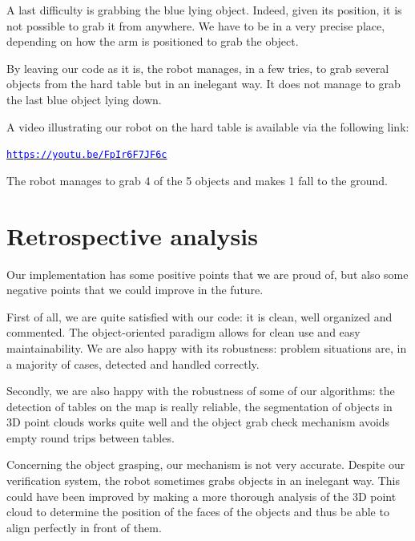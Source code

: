 \documentclass[a4paper, 10pt, conference]{ieeeconf}
\begin{document}
    A last difficulty is grabbing the blue lying object. Indeed, given its position, it is not possible to grab it from anywhere. We have to be in a very precise place, depending on how the arm is positioned to grab the object.
    
    By leaving our code as it is, the robot manages, in a few tries, to grab several objects from the hard table but in an inelegant way. It does not manage to grab the last blue object lying down.
    
    A video illustrating our robot on the hard table is available via the following link:
    
    \begin{center}
        \href{https://youtu.be/FpIr6F7JF6c}{\texttt{\textcolor{blue}{https://youtu.be/FpIr6F7JF6c}}}
    \end{center}
    
    The robot manages to grab 4 of the 5 objects and makes 1 fall to the ground.
    
    
    \section{Retrospective analysis}
    
    Our implementation has some positive points that we are proud of, but also some negative points that we could improve in the future.
    
    First of all, we are quite satisfied with our code: it is clean, well organized and commented. The object-oriented paradigm allows for clean use and easy maintainability. We are also happy with its robustness: problem situations are, in a majority of cases, detected and handled correctly.
    
    Secondly, we are also happy with the robustness of some of our algorithms: the detection of tables on the map is really reliable, the segmentation of objects in 3D point clouds works quite well and the object grab check mechanism avoids empty round trips between tables.
    
    Concerning the object grasping, our mechanism is not very accurate. Despite our verification system, the robot sometimes grabs objects in an inelegant way. This could have been improved by making a more thorough analysis of the 3D point cloud to determine the position of the faces of the objects and thus be able to align perfectly in front of them.
    
\end{document}
